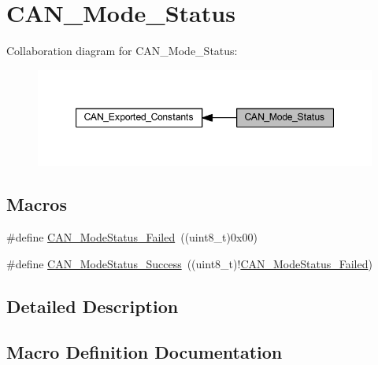 \hypertarget{group___c_a_n___mode___status}{}\section{C\+A\+N\+\_\+\+Mode\+\_\+\+Status}
\label{group___c_a_n___mode___status}
Collaboration diagram for C\+A\+N\+\_\+\+Mode\+\_\+\+Status\+:
\nopagebreak
\begin{figure}[H]
\begin{center}
\leavevmode
\includegraphics[width=347pt]{group___c_a_n___mode___status}
\end{center}
\end{figure}
\subsection*{Macros}
\begin{DoxyCompactItemize}
\item 
\#define \hyperlink{group___c_a_n___mode___status_ga9882944537945325ef08e1986838ea45}{C\+A\+N\+\_\+\+Mode\+Status\+\_\+\+Failed}~((uint8\+\_\+t)0x00)
\item 
\#define \hyperlink{group___c_a_n___mode___status_ga7ca0ea503eb3b3a7c0abdfad27cb6579}{C\+A\+N\+\_\+\+Mode\+Status\+\_\+\+Success}~((uint8\+\_\+t)!\hyperlink{group___c_a_n___mode___status_ga9882944537945325ef08e1986838ea45}{C\+A\+N\+\_\+\+Mode\+Status\+\_\+\+Failed})
\end{DoxyCompactItemize}


\subsection{Detailed Description}


\subsection{Macro Definition Documentation}
\mbox{\label{group___c_a_n___mode___status_ga9882944537945325ef08e1986838ea45}} 
